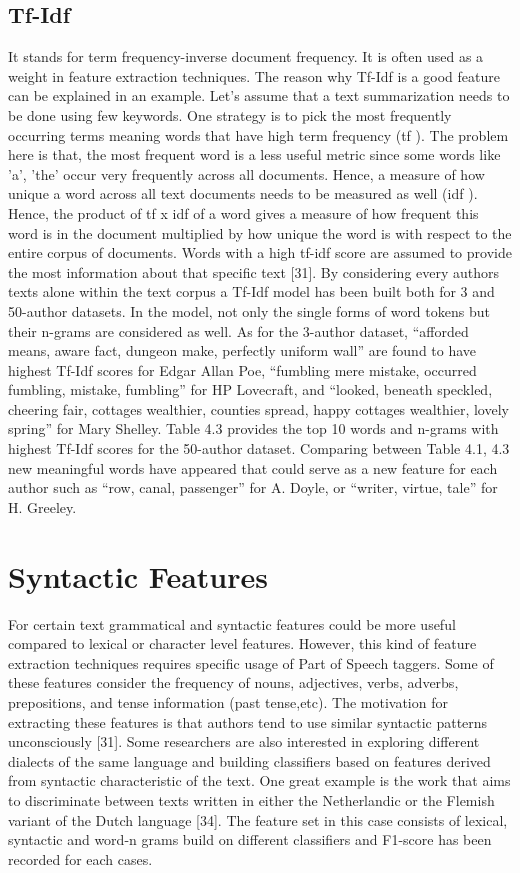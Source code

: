 \subsection{Tf-Idf}

It stands for term frequency-inverse document frequency. It is often used as a weight in feature extraction techniques. The reason why Tf-Idf is a good feature can be explained in an example. Let’s assume that a text summarization needs to be done using few keywords. One strategy is to pick the most frequently occurring
terms meaning words that have high term frequency (tf ). The problem here is that, the most frequent word is a less useful metric since some words like ’a’, ’the’ occur very frequently across all documents. Hence, a measure of how unique a word across all text documents needs to be measured as well (idf ). Hence, the product of tf x idf of a word gives a measure of how frequent this word is in the document multiplied by
how unique the word is with respect to the entire corpus of documents. Words with a high tf-idf score are assumed to provide the most information about that specific text [31].
By considering every authors texts alone within the text corpus a Tf-Idf model has been built both for 3 and 50-author datasets.
In the model, not only the single forms of word tokens but their n-grams are considered as well. 
As for the 3-author dataset, “afforded means, aware fact, dungeon make, perfectly uniform wall” are found to have highest Tf-Idf scores for Edgar Allan Poe, “fumbling mere mistake, occurred fumbling, mistake, fumbling” for HP Lovecraft, and “looked, beneath speckled, cheering fair, cottages wealthier, counties spread, happy cottages wealthier, lovely spring” for Mary Shelley. Table 4.3 provides the top 10 words and n-grams with highest Tf-Idf scores for the 50-author dataset. Comparing between Table 4.1, 4.3 new meaningful words have appeared that could serve as a new feature for each author such as “row, canal, passenger” for A. Doyle, or “writer, virtue, tale” for H. Greeley.


\section{Syntactic Features}

For certain text grammatical and syntactic features could be more useful compared to lexical or character level features. However, this kind of feature extraction techniques requires specific usage of Part of Speech taggers. Some of these features consider the frequency of nouns, adjectives, verbs, adverbs, prepositions, and tense information (past tense,etc). The motivation for extracting these features is that authors tend to use similar syntactic patterns unconsciously [31].
Some researchers are also interested in exploring different dialects of the same language and building classifiers based on features derived from syntactic characteristic of the text. One great example is the work that aims to discriminate between texts written in either the Netherlandic or the Flemish variant of the Dutch language [34].
The feature set in this case consists of lexical, syntactic and word-n grams build on different classifiers and F1-score has been recorded for each cases.


